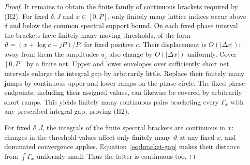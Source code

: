 \documentclass[11pt]{article}
\theoremstyle{definition}
\theoremstyle{remark}
\begin{document}
\begin{proof}
It remains to obtain the finite family of continuous brackets required
by (H2). For fixed $\delta,J$ and $x\in[0,P]$, only finitely many lattice
indices occur above $\delta$ and below the common spectral support bound.
On each fixed phase interval the brackets have finitely many moving
thresholds, of the form
$\vartheta=(x+\log c-jP)/P$, for fixed positive $c$. Their displacement
is $O(|\Delta x|)$; away from them the amplitudes $u_j$ also change by
$O(|\Delta x|)$ uniformly. Cover $[0,P]$ by a finite net. Upper and lower
envelopes over sufficiently short net intervals enlarge the integral
gap by arbitrarily little. Replace their finitely many jumps by
continuous upper and lower ramps on the phase circle. The fixed phase
endpoints, including their assigned values, can likewise be covered by
arbitrarily short ramps. This yields finitely many continuous pairs
bracketing every $\Gamma_x$ with any prescribed integral gap, proving
(H2).

For fixed $\delta,J$, the integrals of the finite spectral brackets
are continuous in $x$: changes in the threshold values affect only
finitely many $\vartheta$ at any fixed $x$, and dominated convergence
applies. Equation~\eqref{eq:bracket-gap} makes their distance from
$\int\Gamma_x$ uniformly small. Thus the latter is continuous too.
\end{proof}
\end{document}
